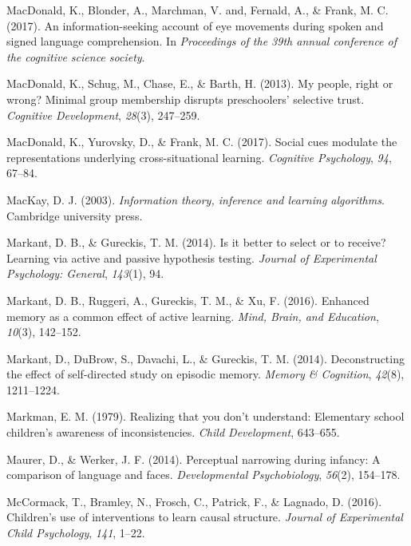 \documentclass[english,floatsintext,man]{apa6}
\theoremstyle{definition}
\theoremstyle{definition}
\theoremstyle{definition}
\theoremstyle{remark}
\begin{document}
\hypertarget{ref-macdonald2017info}{}
MacDonald, K., Blonder, A., Marchman, V. and, Fernald, A., \& Frank, M.
C. (2017). An information-seeking account of eye movements during spoken
and signed language comprehension. In \emph{Proceedings of the 39th
annual conference of the cognitive science society}.

\hypertarget{ref-macdonald2013my}{}
MacDonald, K., Schug, M., Chase, E., \& Barth, H. (2013). My people,
right or wrong? Minimal group membership disrupts preschoolers'
selective trust. \emph{Cognitive Development}, \emph{28}(3), 247--259.

\hypertarget{ref-macdonald2017social}{}
MacDonald, K., Yurovsky, D., \& Frank, M. C. (2017). Social cues
modulate the representations underlying cross-situational learning.
\emph{Cognitive Psychology}, \emph{94}, 67--84.

\hypertarget{ref-mackay2003information}{}
MacKay, D. J. (2003). \emph{Information theory, inference and learning
algorithms}. Cambridge university press.

\hypertarget{ref-markant2014better}{}
Markant, D. B., \& Gureckis, T. M. (2014). Is it better to select or to
receive? Learning via active and passive hypothesis testing.
\emph{Journal of Experimental Psychology: General}, \emph{143}(1), 94.

\hypertarget{ref-markant2016enhanced}{}
Markant, D. B., Ruggeri, A., Gureckis, T. M., \& Xu, F. (2016). Enhanced
memory as a common effect of active learning. \emph{Mind, Brain, and
Education}, \emph{10}(3), 142--152.

\hypertarget{ref-markant2014deconstructing}{}
Markant, D., DuBrow, S., Davachi, L., \& Gureckis, T. M. (2014).
Deconstructing the effect of self-directed study on episodic memory.
\emph{Memory \& Cognition}, \emph{42}(8), 1211--1224.

\hypertarget{ref-markman1979realizing}{}
Markman, E. M. (1979). Realizing that you don't understand: Elementary
school children's awareness of inconsistencies. \emph{Child
Development}, 643--655.

\hypertarget{ref-maurer2014perceptual}{}
Maurer, D., \& Werker, J. F. (2014). Perceptual narrowing during
infancy: A comparison of language and faces. \emph{Developmental
Psychobiology}, \emph{56}(2), 154--178.

\hypertarget{ref-mccormack2016children}{}
McCormack, T., Bramley, N., Frosch, C., Patrick, F., \& Lagnado, D.
(2016). Children's use of interventions to learn causal structure.
\emph{Journal of Experimental Child Psychology}, \emph{141}, 1--22.
\end{document}
